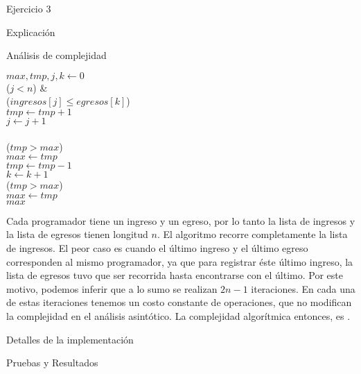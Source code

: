 \begin{section}{Ejercicio 3}
\begin{subsection}{Explicación}
\begin{subsubsection}{Análisis de complejidad}
			\begin{pseudo}
				\tab $max,tmp,j,k \leftarrow 0$ \\
				\tab \WHILE($j< n$) &   \\
				\tab \tab \IF($ingresos[j]\leq egresos[k]$) \\
				\tab \tab \tab $tmp \leftarrow tmp+1$ \\
				\tab \tab \tab $j \leftarrow j+1$ \\
				\tab \tab \ELSE \\
				\tab \tab \tab \IF($tmp>max$) \\
				\tab \tab \tab \tab $max \leftarrow tmp$ \\
				\tab \tab \tab $tmp \leftarrow tmp - 1$ \\
				\tab \tab \tab $k \leftarrow k+1$ \\
				\tab \IF($tmp>max$) \\
				\tab \tab $max \leftarrow tmp$ \\
				\tab \RET $max$
			\end{pseudo}
			Cada programador tiene un ingreso y un egreso, por lo tanto la lista de ingresos y la lista de egresos
			tienen longitud $n$. El algoritmo recorre completamente la lista de ingresos. El peor caso es 
			cuando el último ingreso y el último egreso corresponden al mismo programador, ya que para registrar éste
			último ingreso, la lista de egresos tuvo que ser recorrida hasta encontrarse con el último.
 			Por este motivo, podemos inferir que a lo sumo se realizan $2n -1$ iteraciones. En cada una de estas 
			iteraciones tenemos un costo constante de operaciones, que no modifican la complejidad en el análisis 
			asintótico.
			La complejidad algorítmica entonces, es .

		\end{subsubsection}

	\end{subsection}

	\begin{subsection}{Detalles de la implementación}

	\end{subsection}

	\begin{subsection}{Pruebas y Resultados}			
	\end{subsection}

\end{section}







